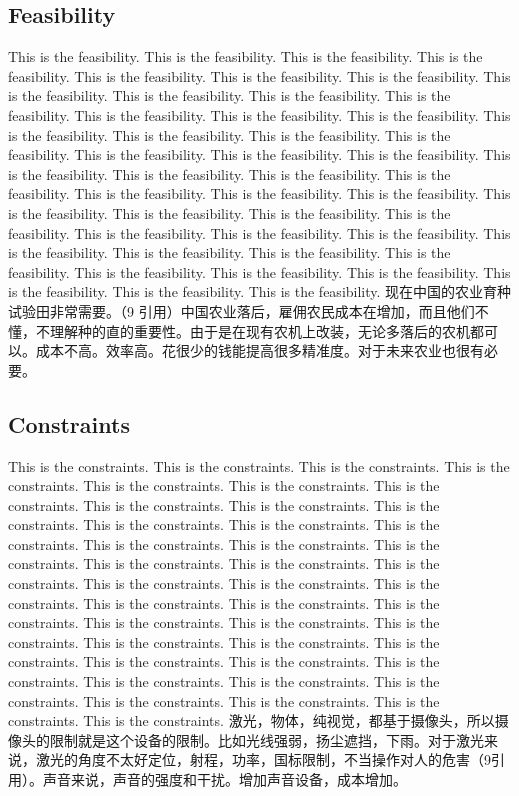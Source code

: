 \documentclass[12pt]{article}
\begin{document}
\begin{flushleft}
\subsection{Feasibility}
This is the feasibility. This is the feasibility. This is the feasibility. This is the feasibility. This is the feasibility. This is the feasibility. This is the feasibility. This is the feasibility. This is the feasibility. This is the feasibility. This is the feasibility. This is the feasibility. This is the feasibility. This is the feasibility. This is the feasibility. This is the feasibility. This is the feasibility. This is the feasibility. This is the feasibility. This is the feasibility. This is the feasibility. This is the feasibility. This is the feasibility. This is the feasibility. This is the feasibility. This is the feasibility. This is the feasibility. This is the feasibility. This is the feasibility. This is the feasibility. This is the feasibility. This is the feasibility. This is the feasibility. This is the feasibility. This is the feasibility. This is the feasibility. This is the feasibility. This is the feasibility. This is the feasibility. This is the feasibility. This is the feasibility. \cite{vis2006survey}This is the feasibility. This is the feasibility. This is the feasibility. This is the feasibility. 
现在中国的农业育种试验田非常需要。（9 引用）中国农业落后，雇佣农民成本在增加，而且他们不懂，不理解种的直的重要性。由于是在现有农机上改装，无论多落后的农机都可以。成本不高。效率高。花很少的钱能提高很多精准度。对于未来农业也很有必要。

\subsection{Constraints}
This is the constraints. This is the constraints. This is the constraints. This is the constraints. This is the constraints. This is the constraints. This is the constraints. This is the constraints. This is the constraints. This is the constraints. This is the constraints. This is the constraints. This is the constraints. This is the constraints. This is the constraints. This is the constraints. This is the constraints. This is the constraints. This is the constraints. This is the constraints. This is the constraints. This is the constraints. This is the constraints. This is the constraints. This is the constraints. This is the constraints. This is the constraints. This is the constraints. This is the constraints. This is the constraints. This is the constraints. This is the constraints. This is the constraints. This is the constraints. This is the constraints. This is the constraints. This is the constraints. \cite{vis2006survey} This is the constraints. This is the constraints. This is the constraints. This is the constraints. 
激光，物体，纯视觉，都基于摄像头，所以摄像头的限制就是这个设备的限制。比如光线强弱，扬尘遮挡，下雨。对于激光来说，激光的角度不太好定位，射程，功率，国标限制，不当操作对人的危害（9引用）。声音来说，声音的强度和干扰。增加声音设备，成本增加。


\end{flushleft}
\end{document}
